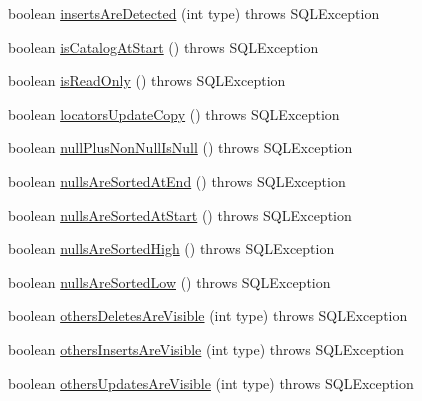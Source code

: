 \begin{DoxyCompactItemize}
\item 
boolean \mbox{\hyperlink{classcom_1_1mysql_1_1cj_1_1jdbc_1_1_database_meta_data_ab83a53969a65b4a474c5ad0eac87ef4e}{inserts\+Are\+Detected}} (int type)  throws S\+Q\+L\+Exception 
\item 
boolean \mbox{\hyperlink{classcom_1_1mysql_1_1cj_1_1jdbc_1_1_database_meta_data_a661d7d6feb31152148b6cdcb5b6b2ead}{is\+Catalog\+At\+Start}} ()  throws S\+Q\+L\+Exception 
\item 
boolean \mbox{\hyperlink{classcom_1_1mysql_1_1cj_1_1jdbc_1_1_database_meta_data_ae2267f22cc38e6bce65f493e566760d1}{is\+Read\+Only}} ()  throws S\+Q\+L\+Exception 
\item 
boolean \mbox{\hyperlink{classcom_1_1mysql_1_1cj_1_1jdbc_1_1_database_meta_data_ac78da02bca393ec069012d58109f562f}{locators\+Update\+Copy}} ()  throws S\+Q\+L\+Exception 
\item 
boolean \mbox{\hyperlink{classcom_1_1mysql_1_1cj_1_1jdbc_1_1_database_meta_data_a355965ebd17887a4761a872e0d6b359d}{null\+Plus\+Non\+Null\+Is\+Null}} ()  throws S\+Q\+L\+Exception 
\item 
boolean \mbox{\hyperlink{classcom_1_1mysql_1_1cj_1_1jdbc_1_1_database_meta_data_ad02ce86ef86f85d7f12d9d56c3bd07ae}{nulls\+Are\+Sorted\+At\+End}} ()  throws S\+Q\+L\+Exception 
\item 
boolean \mbox{\hyperlink{classcom_1_1mysql_1_1cj_1_1jdbc_1_1_database_meta_data_a9f5037c0ccef98ea87a91af0cf42c29c}{nulls\+Are\+Sorted\+At\+Start}} ()  throws S\+Q\+L\+Exception 
\item 
boolean \mbox{\hyperlink{classcom_1_1mysql_1_1cj_1_1jdbc_1_1_database_meta_data_ad87c8711db15505c80c215af9cf5107e}{nulls\+Are\+Sorted\+High}} ()  throws S\+Q\+L\+Exception 
\item 
boolean \mbox{\hyperlink{classcom_1_1mysql_1_1cj_1_1jdbc_1_1_database_meta_data_ac35f97e98a243859aba5bb5c60aee7fa}{nulls\+Are\+Sorted\+Low}} ()  throws S\+Q\+L\+Exception 
\item 
boolean \mbox{\hyperlink{classcom_1_1mysql_1_1cj_1_1jdbc_1_1_database_meta_data_a056320917f222b8b7b13256755ef2ebd}{others\+Deletes\+Are\+Visible}} (int type)  throws S\+Q\+L\+Exception 
\item 
boolean \mbox{\hyperlink{classcom_1_1mysql_1_1cj_1_1jdbc_1_1_database_meta_data_a2cb84d63be00798e69df3b6cef77ee8c}{others\+Inserts\+Are\+Visible}} (int type)  throws S\+Q\+L\+Exception 
\item 
boolean \mbox{\hyperlink{classcom_1_1mysql_1_1cj_1_1jdbc_1_1_database_meta_data_ae11c9c0e5cce7a5f68ce7e0fd44060bc}{others\+Updates\+Are\+Visible}} (int type)  throws S\+Q\+L\+Exception 

\end{DoxyCompactItemize}
